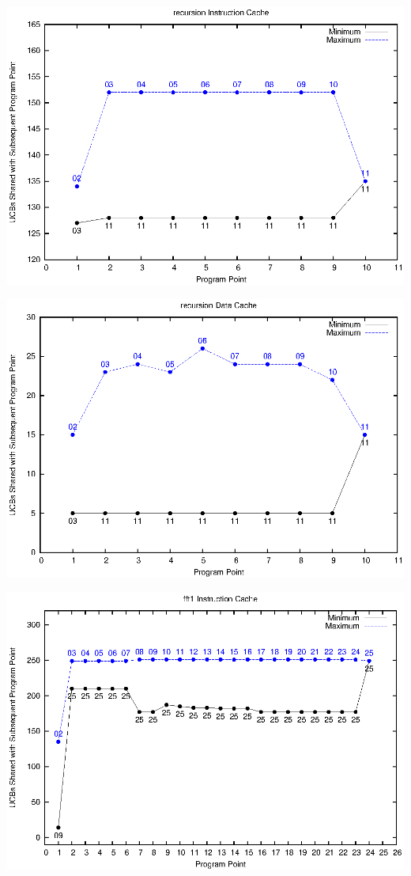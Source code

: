 \begin{center}
  \includegraphics[width=\linewidth]{eps/recursion-icache.eps}
\end{center}

\begin{center}
  \includegraphics[width=\linewidth]{eps/recursion-dcache.eps}
\end{center}


\begin{center}
  \includegraphics[width=\linewidth]{eps/fft1-icache.eps}
\end{center}

